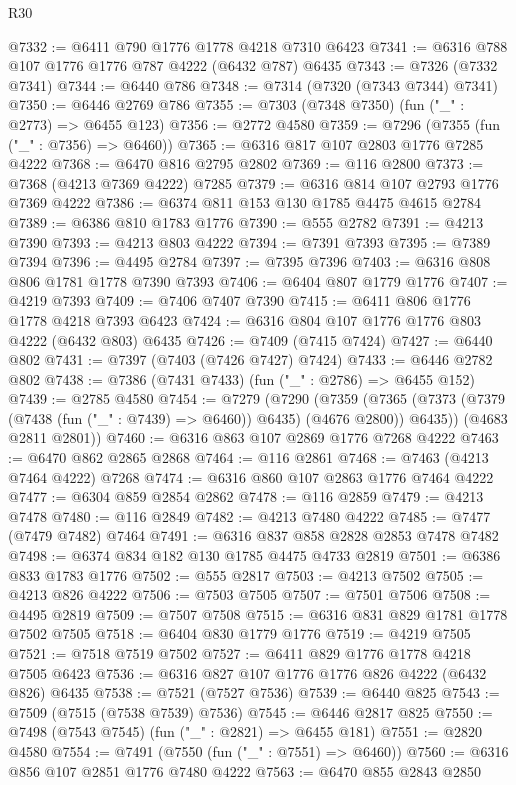 \begin{lexlean}{R30}
\begin{coremodule}
{{{{{@7332 := @6411 @790 @1776 @1778 @4218 @7310 @6423
@7341 := @6316 @788 @107 @1776 @1776 @787 @4222 (@6432 @787) @6435
@7343 := @7326 (@7332 @7341)
@7344 := @6440 @786
@7348 := @7314 (@7320 (@7343 @7344) @7341)
@7350 := @6446 @2769 @786
@7355 := @7303 (@7348 @7350) (fun ("_" : @2773) => @6455 @123)
@7356 := @2772 @4580
@7359 := @7296 (@7355 (fun ("_" : @7356) => @6460))
@7365 := @6316 @817 @107 @2803 @1776 @7285 @4222
@7368 := @6470 @816 @2795 @2802
@7369 := @116 @2800
@7373 := @7368 (@4213 @7369 @4222) @7285
@7379 := @6316 @814 @107 @2793 @1776 @7369 @4222
@7386 := @6374 @811 @153 @130 @1785 @4475 @4615 @2784
@7389 := @6386 @810 @1783 @1776
@7390 := @555 @2782
@7391 := @4213 @7390
@7393 := @4213 @803 @4222
@7394 := @7391 @7393
@7395 := @7389 @7394
@7396 := @4495 @2784
@7397 := @7395 @7396
@7403 := @6316 @808 @806 @1781 @1778 @7390 @7393
@7406 := @6404 @807 @1779 @1776
@7407 := @4219 @7393
@7409 := @7406 @7407 @7390
@7415 := @6411 @806 @1776 @1778 @4218 @7393 @6423
@7424 := @6316 @804 @107 @1776 @1776 @803 @4222 (@6432 @803) @6435
@7426 := @7409 (@7415 @7424)
@7427 := @6440 @802
@7431 := @7397 (@7403 (@7426 @7427) @7424)
@7433 := @6446 @2782 @802
@7438 := @7386 (@7431 @7433) (fun ("_" : @2786) => @6455 @152)
@7439 := @2785 @4580
@7454 := @7279
    (@7290
      (@7359 (@7365 (@7373 (@7379 (@7438 (fun ("_" : @7439) => @6460)) @6435) (@4676 @2800)) @6435))
      (@4683 @2811 @2801))
@7460 := @6316 @863 @107 @2869 @1776 @7268 @4222
@7463 := @6470 @862 @2865 @2868
@7464 := @116 @2861
@7468 := @7463 (@4213 @7464 @4222) @7268
@7474 := @6316 @860 @107 @2863 @1776 @7464 @4222
@7477 := @6304 @859 @2854 @2862
@7478 := @116 @2859
@7479 := @4213 @7478
@7480 := @116 @2849
@7482 := @4213 @7480 @4222
@7485 := @7477 (@7479 @7482) @7464
@7491 := @6316 @837 @858 @2828 @2853 @7478 @7482
@7498 := @6374 @834 @182 @130 @1785 @4475 @4733 @2819
@7501 := @6386 @833 @1783 @1776
@7502 := @555 @2817
@7503 := @4213 @7502
@7505 := @4213 @826 @4222
@7506 := @7503 @7505
@7507 := @7501 @7506
@7508 := @4495 @2819
@7509 := @7507 @7508
@7515 := @6316 @831 @829 @1781 @1778 @7502 @7505
@7518 := @6404 @830 @1779 @1776
@7519 := @4219 @7505
@7521 := @7518 @7519 @7502
@7527 := @6411 @829 @1776 @1778 @4218 @7505 @6423
@7536 := @6316 @827 @107 @1776 @1776 @826 @4222 (@6432 @826) @6435
@7538 := @7521 (@7527 @7536)
@7539 := @6440 @825
@7543 := @7509 (@7515 (@7538 @7539) @7536)
@7545 := @6446 @2817 @825
@7550 := @7498 (@7543 @7545) (fun ("_" : @2821) => @6455 @181)
@7551 := @2820 @4580
@7554 := @7491 (@7550 (fun ("_" : @7551) => @6460))
@7560 := @6316 @856 @107 @2851 @1776 @7480 @4222
@7563 := @6470 @855 @2843 @2850
}}}}}
\end{coremodule}
\end{lexlean}
